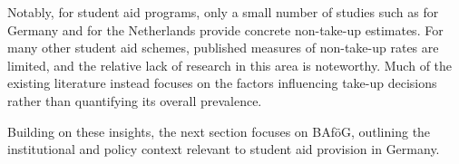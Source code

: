 

Notably, for student aid programs, only a small number of studies such as \cite{herber_non-take-up_2019} for Germany and \cite{konijn_quantifying_2023} for the Netherlands provide concrete non-take-up estimates. For many other student aid schemes, published measures of non-take-up rates are limited, and the relative lack of research in this area is noteworthy. Much of the existing literature instead focuses on the factors influencing take-up decisions rather than quantifying its overall prevalence.

Building on these insights, the next section focuses on BAföG, outlining the institutional and policy context relevant to student aid provision in Germany.
